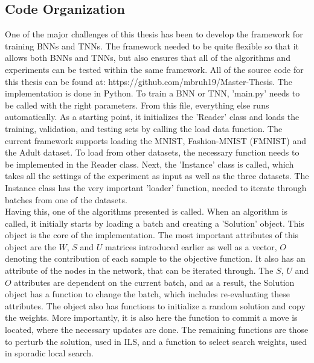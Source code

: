 
\subsection{Code Organization}

One of the major challenges of this thesis has been to develop the framework for training BNNs and TNNs. The framework needed to be quite flexible so that it allows both BNNs and TNNs, but also ensures that all of the algorithms and experiments can be tested within the same framework. All of the source code for this thesis can be found at: https://github.com/mbruh19/Master-Thesis. The implementation is done in Python. To train a BNN or TNN, 'main.py' needs to be called with the right parameters. From this file, everything else runs automatically. As a starting point, it initializes the 'Reader' class and loads the training, validation, and testing sets by calling the load data function. The current framework supports loading the MNIST, Fashion-MNIST (FMNIST) and the Adult dataset. To load from other datasets, the necessary function needs to be implemented in the Reader class. Next, the 'Instance' class is called, which takes all the settings of the experiment as input as well as the three datasets. The Instance class has the very important 'loader' function, needed to iterate through batches from one of the datasets. \\

\noindent Having this, one of the algorithms presented is called. When an algorithm is called, it initially starts by loading a batch and creating a 'Solution' object. This object is the core of the implementation. The most important attributes of this object are the $W$, $S$ and $U$ matrices introduced earlier as well as a vector, $O$ denoting the contribution of each sample to the objective function. It also has an attribute of the nodes in the network, that can be iterated through. The $S$, $U$ and $O$ attributes are dependent on the current batch, and as a result, the Solution object has a function to change the batch, which includes re-evaluating these attributes. The object also has functions to initialize a random solution and copy the weights. More importantly, it is also here the function to commit a move is located, where the necessary updates are done. The remaining functions are those to perturb the solution, used in ILS, and a function to select search weights, used in sporadic local search. \\


